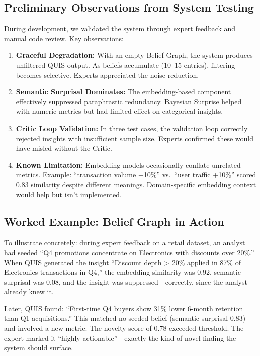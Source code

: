 \documentclass[conference]{IEEEtran}
\begin{document}
\subsection{Preliminary Observations from System Testing}

During development, we validated the system through expert feedback and
manual code review. Key observations:

\begin{enumerate}
  \item \textbf{Graceful Degradation:} With an empty Belief Graph, the
  system produces unfiltered QUIS output. As beliefs accumulate (10--15
  entries), filtering becomes selective. Experts appreciated the noise
  reduction.

  \item \textbf{Semantic Surprisal Dominates:} The embedding-based component
  effectively suppressed paraphrastic redundancy. Bayesian Surprise helped
  with numeric metrics but had limited effect on categorical insights.

  \item \textbf{Critic Loop Validation:} In three test cases, the validation
  loop correctly rejected insights with insufficient sample size. Experts
  confirmed these would have misled without the Critic.

  \item \textbf{Known Limitation:} Embedding models occasionally conflate
  unrelated metrics. Example: ``transaction volume +10\%'' vs.\ ``user
  traffic +10\%'' scored 0.83 similarity despite different meanings.
  Domain-specific embedding context would help but isn't implemented.
\end{enumerate}

\subsection{Worked Example: Belief Graph in Action}

To illustrate concretely: during expert feedback on a retail dataset, an
analyst had seeded ``Q4 promotions concentrate on Electronics with discounts
over 20\%.'' When QUIS generated the insight ``Discount depth > 20\% applied
in 87\% of Electronics transactions in Q4,'' the embedding similarity was 0.92,
semantic surprisal was 0.08, and the insight was suppressed---correctly, since
the analyst already knew it.

Later, QUIS found: ``First-time Q4 buyers show 31\% lower 6-month retention
than Q1 acquisitions.'' This matched no seeded belief (semantic surprisal 0.83)
and involved a new metric. The novelty score of 0.78 exceeded threshold. The
expert marked it ``highly actionable''---exactly the kind of novel finding the
system should surface.
\end{document}

